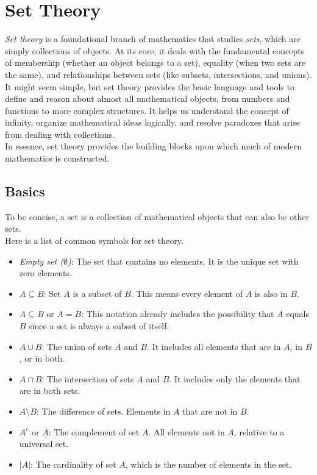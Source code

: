 \newpage
\section{Set Theory}

\emph{Set theory} is a foundational branch of mathematics that studies \emph{sets}, which are simply 
collections of objects. At its core, it deals with the fundamental concepts of membership 
(whether an object belongs to a set), equality (when two sets are the same), and relationships 
between sets (like subsets, intersections, and unions).\\
It might seem simple, but set theory provides the basic language and tools to define 
and reason about almost all mathematical objects, from numbers and functions to 
more complex structures. It helps us understand the concept of infinity, organize mathematical 
ideas logically, and resolve paradoxes that arise from dealing with collections.\\
In essence, set theory provides the building blocks upon which much of modern mathematics is constructed.

\subsection{Basics}
To be concise, a set is a collection of mathematical objects that can also be other sets.\\
Here is a list of common symbols for set theory.

\begin{itemize}
	\item \emph{Empty set (\(\emptyset\))}: The set that contains no elements. It is the unique set with zero elements.

	\item \(A \subseteq B\): Set \(A\) is a subset of \(B\). This means every element of \(A\) is also in \(B\).

	\item \(A \subseteq B\) or \(A = B\): This notation already includes the possibility that \(A\) equals \(B\) since a set is always a subset of itself.

	\item \(A \cup B\): The union of sets \(A\) and \(B\). It includes all elements that are in \(A\), in \(B\), or in both.

	\item \(A \cap B\): The intersection of sets \(A\) and \(B\). It includes only the elements that are in both sets.

	\item \(A \setminus B\): The difference of sets. Elements in \(A\) that are not in \(B\).

	\item \(A^c\) or \(\overline{A}\): The complement of set \(A\). All elements not in \(A\), relative to a universal set.

	\item \(|A|\): The cardinality of set \(A\), which is the number of elements in the set.
\end{itemize}
\smallskip


